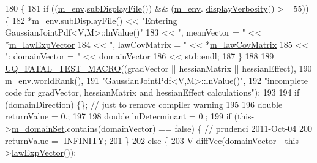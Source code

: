\begin{DoxyCode}
180 \{
181   \textcolor{keywordflow}{if} ((\hyperlink{class_q_u_e_s_o_1_1_base_scalar_function_adf44141aeb765d97613286f88f235f04}{m\_env}.\hyperlink{class_q_u_e_s_o_1_1_base_environment_a8a0064746ae8dddfece4229b9ad374d6}{subDisplayFile}()) && (\hyperlink{class_q_u_e_s_o_1_1_base_scalar_function_adf44141aeb765d97613286f88f235f04}{m\_env}.
      \hyperlink{class_q_u_e_s_o_1_1_base_environment_a1fe5f244fc0316a0ab3e37463f108b96}{displayVerbosity}() >= 55)) \{
182     *\hyperlink{class_q_u_e_s_o_1_1_base_scalar_function_adf44141aeb765d97613286f88f235f04}{m\_env}.\hyperlink{class_q_u_e_s_o_1_1_base_environment_a8a0064746ae8dddfece4229b9ad374d6}{subDisplayFile}() << \textcolor{stringliteral}{"Entering GaussianJointPdf<V,M>::lnValue()"}
183                             << \textcolor{stringliteral}{", meanVector = "}   << *\hyperlink{class_q_u_e_s_o_1_1_gaussian_joint_pdf_a8ef2407f5234ce5e0ed0d05a21f183e5}{m\_lawExpVector}
184                       << \textcolor{stringliteral}{", lawCovMatrix = "} << *\hyperlink{class_q_u_e_s_o_1_1_gaussian_joint_pdf_af13b72027783d8db03721951a71087d8}{m\_lawCovMatrix}
185                             << \textcolor{stringliteral}{": domainVector = "} << domainVector
186                             << std::endl;
187   \}
188 
189   \hyperlink{_defines_8h_a56d63d18d0a6d45757de47fcc06f574d}{UQ\_FATAL\_TEST\_MACRO}((gradVector || hessianMatrix || hessianEffect),
190                       \hyperlink{class_q_u_e_s_o_1_1_base_scalar_function_adf44141aeb765d97613286f88f235f04}{m\_env}.\hyperlink{class_q_u_e_s_o_1_1_base_environment_a78b57112bbd0e6dd0e8afec00b40ffa7}{worldRank}(),
191                       \textcolor{stringliteral}{"GaussianJointPdf<V,M>::lnValue()"},
192                       \textcolor{stringliteral}{"incomplete code for gradVector, hessianMatrix and hessianEffect calculations"});
193 
194   \textcolor{keywordflow}{if} (domainDirection) \{\}; \textcolor{comment}{// just to remove compiler warning}
195 
196   \textcolor{keywordtype}{double} returnValue = 0.;
197 
198   \textcolor{keywordtype}{double} lnDeterminant = 0.;
199   \textcolor{keywordflow}{if} (this->\hyperlink{class_q_u_e_s_o_1_1_base_scalar_function_a67696e86211197938c72cd11863f5cf8}{m\_domainSet}.contains(domainVector) == \textcolor{keyword}{false}) \{ \textcolor{comment}{// prudenci 2011-Oct-04}
200     returnValue = -INFINITY;
201   \}
202   \textcolor{keywordflow}{else} \{
203     V diffVec(domainVector - this->\hyperlink{class_q_u_e_s_o_1_1_gaussian_joint_pdf_a927c7abde2026d17586013a04a0a053e}{lawExpVector}());

\end{DoxyCode}
